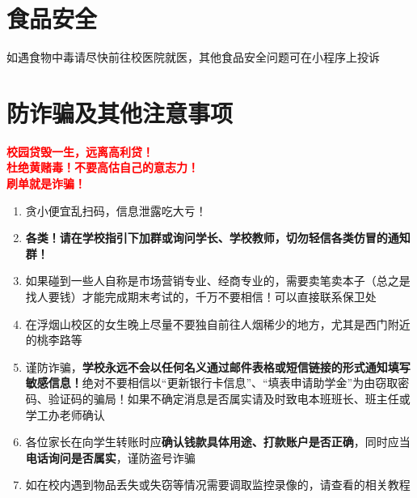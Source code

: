 \section[食品安全]{食品安全}
如遇食物中毒请尽快前往校医院就医，其他食品安全问题可在小程序上投诉

\section[防诈骗及其他注意事项]{防诈骗及其他注意事项}
\begin{table}[H]
    \centering
    \large
    \textbf{\textcolor{red}{校园贷毁一生，远离高利贷！}}\\
    \textbf{\textcolor{red}{杜绝黄赌毒！不要高估自己的意志力！}}\\
    \textbf{\textcolor{red}{刷单就是诈骗！}}
\end{table}

\begin{enumerate}
    \item 贪小便宜乱扫码，信息泄露吃大亏！
    \item \textbf{各类！请在学校指引下加群或询问学长、学校教师，切勿轻信各类仿冒的通知群！}
    \item 如果碰到一些人自称是市场营销专业、经商专业的，需要卖笔卖本子\footnotemark （总之是找人要钱）才能完成期末考试的，千万不要相信！可以直接联系保卫处
    \item 在浮烟山校区的女生晚上尽量不要独自前往人烟稀少的地方，尤其是西门附近的桃李路等
    \item 谨防诈骗，\textbf{学校永远不会以任何名义通过邮件表格或短信链接的形式通知填写敏感信息！}绝对不要相信以“更新银行卡信息”、“填表申请助学金”为由窃取密码、验证码的骗局！如果不确定消息是否属实请及时致电本班班长、班主任或学工办老师确认
    \item 各位家长在向学生转账时应\textbf{确认钱款具体用途、打款账户是否正确}，同时应当\textbf{电话询问是否属实}，谨防盗号诈骗
    \item 如在校内遇到物品丢失或失窃等情况需要调取监控录像的，请查看的相关教程
\end{enumerate}
